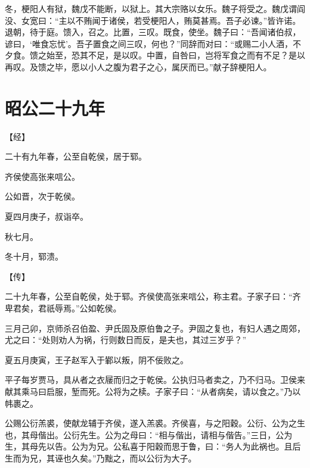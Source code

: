 \documentclass[a4paper,12pt,UTF8,twoside]{ctexbook}
\begin{document}
冬，梗阳人有狱，魏戊不能断，以狱上。其大宗赂以女乐。魏子将受之。魏戊谓阎没、女宽曰：“主以不贿闻于诸侯，若受梗阳人，贿莫甚焉。吾子必谏。”皆许诺。退朝，待于庭。馈入，召之。比置，三叹。既食，使坐。魏子曰：“吾闻诸伯叔，谚曰，‘唯食忘忧’。吾子置食之间三叹，何也？”同辞而对曰：“或赐二小人酒，不夕食。馈之始至，恐其不足，是以叹。中置，自咎曰，岂将军食之而有不足？是以再叹。及馈之毕，愿以小人之腹为君子之心，属厌而已。”献子辞梗阳人。


\chapter{昭公二十九年}



【经】

二十有九年春，公至自乾侯，居于郓。

齐侯使高张来唁公。

公如晋，次于乾侯。

夏四月庚子，叔诣卒。

秋七月。

冬十月，郓溃。

【传】

二十九年春，公至自乾侯，处于郓。齐侯使高张来唁公，称主君。子家子曰：“齐卑君矣，君祇辱焉。”公如乾侯。

三月己卯，京师杀召伯盈、尹氏固及原伯鲁之子。尹固之复也，有妇人遇之周郊，尤之曰：“处则劝人为祸，行则数日而反，是夫也，其过三岁乎？”

夏五月庚寅，王子赵军入于鄻以叛，阴不佞败之。

平子每岁贾马，具从者之衣屦而归之于乾侯。公执归马者卖之，乃不归马。卫侯来献其乘马曰启服，堑而死。公将为之椟。子家子曰：“从者病矣，请以食之。”乃以帏裹之。

公赐公衍羔裘，使献龙辅于齐侯，遂入羔裘。齐侯喜，与之阳穀。公衍、公为之生也，其母偕出。公衍先生。公为之母曰：“相与偕出，请相与偕告。”三日，公为生，其母先以告。公为为兄。公私喜于阳穀而思于鲁，曰：“务人为此祸也。且后生而为兄，其诬也久矣。”乃黜之，而以公衍为大子。
\end{document}
